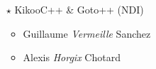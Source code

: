 \documentclass[a4paper]{article}
\begin{document}
\begin{multicols*}{2}
\begin{itemize}
            \vspace{0.3cm}

        \item[$\star$] KikooC++ \& Goto++ (NDI)
            \begin{itemize}
                \item Guillaume \emph{Vermeille} Sanchez
                \item Alexis \emph{Horgix} Chotard
            \end{itemize}

            \vspace{0.3cm}
    \end{itemize}

\end{multicols*}
\end{document}
